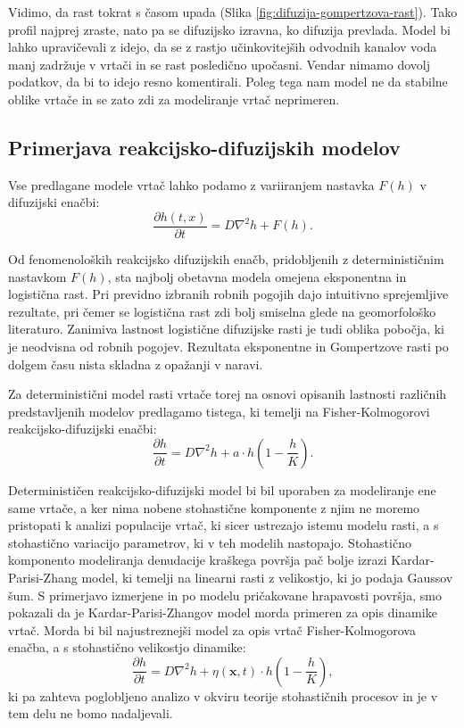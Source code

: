 \documentclass[a4paper, twoside, 12pt]{book}
\begin{document}
    Vidimo, da rast tokrat s časom upada (Slika \ref{fig:difuzija-gompertzova-rast}). Tako profil najprej zraste, nato pa se difuzijsko izravna, ko difuzija prevlada.
    Model bi lahko upravičevali z idejo, da se z rastjo učinkovitejših odvodnih kanalov voda manj zadržuje v vrtači in se rast posledično upočasni. Vendar nimamo dovolj podatkov, da bi to idejo resno komentirali. Poleg tega nam model ne da stabilne oblike vrtače in se zato zdi za modeliranje vrtač neprimeren.

\subsection{Primerjava reakcijsko-difuzijskih modelov}

Vse predlagane modele vrtač lahko podamo z variiranjem nastavka $F(h)$ v difuzijski enačbi:
\begin{equation}
  \frac{ \partial h(t,x) }{ \partial t} = D \nabla^2 h + F(h).
  \label{dinamicna-splosna3}
\end{equation}

Od fenomenoloških reakcijsko difuzijskih enačb, pridobljenih z determinističnim nastavkom $F(h)$, sta najbolj obetavna modela omejena eksponentna in logistična rast. Pri previdno izbranih robnih pogojih dajo intuitivno sprejemljive rezultate, pri čemer se logistična rast zdi bolj smiselna glede na geomorfološko literaturo. Zanimiva lastnost logistične difuzijske rasti je tudi oblika pobočja, ki je neodvisna od robnih pogojev.
Rezultata eksponentne in Gompertzove rasti po dolgem času nista skladna z opažanji v naravi.

Za deterministični model rasti vrtače torej na osnovi opisanih lastnosti različnih predstavljenih modelov predlagamo tistega, ki temelji na Fisher-Kolmogorovi reakcijsko-difuzijski enačbi:
\begin{equation}
  \frac{ \partial h}{ \partial t} = D \nabla^2 h + a \cdot h (1 - \frac{h}{K}).
  \label{dinamicna-splosna4}
\end{equation}

Determinističen reakcijsko-difuzijski model bi bil uporaben za modeliranje ene same vrtače, a ker nima nobene stohastične komponente z njim ne moremo pristopati k analizi populacije vrtač, ki sicer ustrezajo istemu modelu rasti, a s stohastično variacijo parametrov, ki v teh modelih nastopajo. Stohastično komponento modeliranja denudacije kraškega površja pač bolje izrazi Kardar-Parisi-Zhang model, ki temelji na linearni rasti z velikostjo, ki jo podaja Gaussov šum. S primerjavo izmerjene in po modelu pričakovane hrapavosti površja, smo pokazali da je Kardar-Parisi-Zhangov model morda primeren za opis dinamike vrtač. Morda bi bil najustreznejši model za opis vrtač Fisher-Kolmogorova enačba, a s stohastično velikostjo dinamike:
\begin{equation}
  \frac{ \partial h}{ \partial t} = D \nabla^2 h + \eta(\mathbf{x},t) \cdot h(1 - \frac{h}{K}),
  \label{dinamicna-splosna5}
\end{equation}
ki pa zahteva poglobljeno analizo v okviru teorije stohastičnih procesov in je v tem delu ne bomo nadaljevali.
\end{document}
